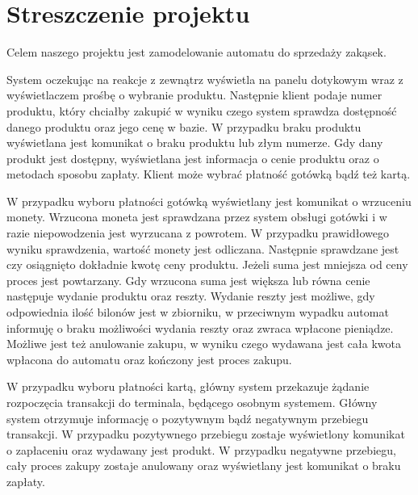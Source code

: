 \documentclass[11pt]{article}
\begin{document}
	\tableofcontents
	\cleardoublepage
	\setcounter{page}{2}
	
	\section{Streszczenie projektu}
			Celem naszego projektu jest zamodelowanie automatu do sprzedaży zakąsek.
			
			System oczekując na reakcje z zewnątrz wyświetla na panelu dotykowym wraz z wyświetlaczem prośbę o wybranie produktu. Następnie klient podaje numer produktu, który chciałby zakupić w wyniku czego system sprawdza dostępność danego produktu oraz jego cenę w bazie. W przypadku braku produktu wyświetlana jest komunikat o braku produktu lub złym numerze. Gdy dany produkt jest dostępny, wyświetlana  jest informacja o cenie produktu oraz o metodach sposobu zapłaty. Klient może wybrać płatność gotówką bądź też kartą.
			
			W przypadku wyboru płatności gotówką wyświetlany jest komunikat o wrzuceniu monety. Wrzucona moneta jest sprawdzana przez system obsługi gotówki i w razie niepowodzenia jest wyrzucana z powrotem. W przypadku prawidłowego wyniku sprawdzenia, wartość monety jest odliczana. Następnie sprawdzane jest czy osiągnięto dokładnie kwotę ceny produktu. Jeżeli suma jest mniejsza od ceny proces jest powtarzany. Gdy wrzucona suma jest większa lub równa cenie następuje wydanie produktu oraz reszty. Wydanie reszty jest możliwe, gdy odpowiednia ilość bilonów jest w zbiorniku, w przeciwnym wypadku automat informuję o braku możliwości wydania reszty oraz zwraca wpłacone pieniądze. Możliwe jest też anulowanie zakupu, w wyniku czego wydawana jest cała kwota wpłacona do automatu oraz kończony jest proces zakupu.
			
			W przypadku wyboru płatności kartą, główny system przekazuje żądanie rozpoczęcia transakcji do terminala, będącego osobnym systemem. Główny system otrzymuje informację o pozytywnym bądź negatywnym przebiegu transakcji. W przypadku pozytywnego przebiegu zostaje wyświetlony komunikat o zapłaceniu oraz wydawany jest produkt. W przypadku negatywne przebiegu, cały proces zakupy zostaje anulowany oraz wyświetlany jest komunikat o braku zapłaty.
			
\end{document}

